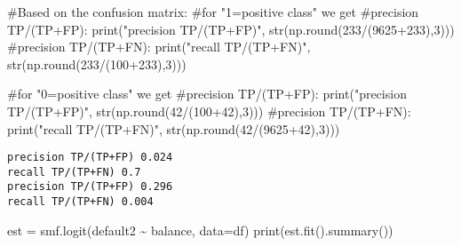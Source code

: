\documentclass[
  letterpaper,
  DIV=11,
  numbers=noendperiod]{scrreprt}
\newenvironment{Shaded}{\begin{snugshade}}{\end{snugshade}}
\newcommand{\BuiltInTok}[1]{\textcolor[rgb]{0.00,0.23,0.31}{#1}}
\newcommand{\CommentTok}[1]{\textcolor[rgb]{0.37,0.37,0.37}{#1}}
\newcommand{\DecValTok}[1]{\textcolor[rgb]{0.68,0.00,0.00}{#1}}
\newcommand{\NormalTok}[1]{\textcolor[rgb]{0.00,0.23,0.31}{#1}}
\newcommand{\OperatorTok}[1]{\textcolor[rgb]{0.37,0.37,0.37}{#1}}
\newcommand{\StringTok}[1]{\textcolor[rgb]{0.13,0.47,0.30}{#1}}
\begin{document}
\begin{Shaded}
\begin{Highlighting}[]
\CommentTok{\#Based on the confusion matrix:}
\CommentTok{\#for "1=positive class" we get}
\CommentTok{\#precision TP/(TP+FP):}
\BuiltInTok{print}\NormalTok{(}\StringTok{"precision TP/(TP+FP)"}\NormalTok{, }\BuiltInTok{str}\NormalTok{(np.}\BuiltInTok{round}\NormalTok{(}\DecValTok{233}\OperatorTok{/}\NormalTok{(}\DecValTok{9625}\OperatorTok{+}\DecValTok{233}\NormalTok{),}\DecValTok{3}\NormalTok{)))}
\CommentTok{\#precision TP/(TP+FN):}
\BuiltInTok{print}\NormalTok{(}\StringTok{"recall TP/(TP+FN)"}\NormalTok{, }\BuiltInTok{str}\NormalTok{(np.}\BuiltInTok{round}\NormalTok{(}\DecValTok{233}\OperatorTok{/}\NormalTok{(}\DecValTok{100}\OperatorTok{+}\DecValTok{233}\NormalTok{),}\DecValTok{3}\NormalTok{)))}

\CommentTok{\#for "0=positive class" we get}
\CommentTok{\#precision TP/(TP+FP):}
\BuiltInTok{print}\NormalTok{(}\StringTok{"precision TP/(TP+FP)"}\NormalTok{, }\BuiltInTok{str}\NormalTok{(np.}\BuiltInTok{round}\NormalTok{(}\DecValTok{42}\OperatorTok{/}\NormalTok{(}\DecValTok{100}\OperatorTok{+}\DecValTok{42}\NormalTok{),}\DecValTok{3}\NormalTok{)))}
\CommentTok{\#precision TP/(TP+FN):}
\BuiltInTok{print}\NormalTok{(}\StringTok{"recall TP/(TP+FN)"}\NormalTok{, }\BuiltInTok{str}\NormalTok{(np.}\BuiltInTok{round}\NormalTok{(}\DecValTok{42}\OperatorTok{/}\NormalTok{(}\DecValTok{9625}\OperatorTok{+}\DecValTok{42}\NormalTok{),}\DecValTok{3}\NormalTok{)))}
\end{Highlighting}
\end{Shaded}

\begin{verbatim}
precision TP/(TP+FP) 0.024
recall TP/(TP+FN) 0.7
precision TP/(TP+FP) 0.296
recall TP/(TP+FN) 0.004
\end{verbatim}

\begin{Shaded}
\begin{Highlighting}[]
\NormalTok{est }\OperatorTok{=}\NormalTok{ smf.logit(}\StringTok{\textquotesingle{}default2 \textasciitilde{} balance\textquotesingle{}}\NormalTok{, data}\OperatorTok{=}\NormalTok{df)}
\BuiltInTok{print}\NormalTok{(est.fit().summary())}
\end{Highlighting}
\end{Shaded}
\end{document}
